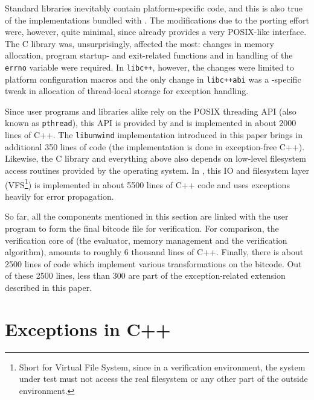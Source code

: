 Standard libraries inevitably contain platform-specific code, and this
is also true of the implementations bundled with \divine{}. The
modifications due to the porting effort were, however, quite minimal,
since \dios{} already provides a very POSIX-like interface. The C library
was, unsurprisingly, affected the most: changes in memory allocation,
program startup- and exit-related functions and in handling of the
\texttt{errno} variable were required. In \texttt{libc++}, however, the
changes were limited to platform configuration macros and the only
change in \texttt{libc++abi} was a \dios{}-specific tweak in allocation of
thread-local storage for exception handling.

Since user programs and libraries alike rely on the POSIX threading API
(also known as \texttt{pthread}), this API is provided by \dios{} and is
implemented in about 2000 lines of C++. The \texttt{libunwind}
implementation introduced in this paper brings in additional 350 lines
of code (the implementation is done in exception-free C++). Likewise,
the C library and everything above also depends on low-level filesystem
access routines provided by the operating system. In \dios{}, this IO and
filesystem layer (VFS\footnote{Short for Virtual File System, since in a
  verification environment, the system under test must not access the
  real filesystem or any other part of the outside environment.}) is
implemented in about 5500 lines of C++ code and uses exceptions heavily
for error propagation.

So far, all the components mentioned in this section are linked with the
user program to form the final bitcode file for verification. For
comparison, the verification core of \divine{} (the \divm{} evaluator, memory
management and the verification algorithm), amounts to roughly 6
thousand lines of C++. Finally, there is about 2500 lines of code which
implement various transformations on the \llvm{} bitcode. Out of these 2500
lines, less than 300 are part of the exception-related extension
described in this paper.

\section{Exceptions in C++}\label{sec:exceptions}

